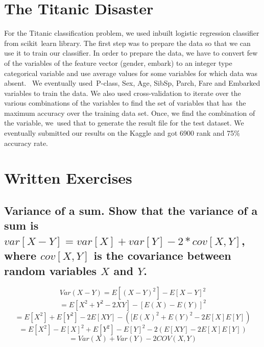 \documentclass[11pt,letterpaper]{article}
\begin{document}
\section{The Titanic Disaster}
For the Titanic classification problem, we used inbuilt logistic regression classifier from scikit learn library. The first step was to prepare the data so that we can use it to train our classifier. In order to prepare the data, we have to convert few of the variables of the feature vector (gender, embark) to an integer type categorical variable and use average values for some variables for which data was absent.  We eventually used P-class, Sex, Age, SibSp, Parch, Fare and Embarked variables to train the data. We also used cross-validation to iterate over the various combinations of the variables to find the set of variables that has the maximum accuracy over the training data set. Once, we find the combination of the variable, we used that to generate the result file for the test dataset. We eventually submitted our results on the Kaggle and got 6900 rank and 75\% accuracy rate.

\section{Written Exercises}
\subsection{Variance of a sum. Show that the variance of a sum is $var[X-Y]=var[X] + var[Y] - 2*cov[X,Y]$, where $cov[X,Y]$ is the covariance between random variables $X$ and $Y$.}
$$ Var(X-Y) = E[(X-Y)^2] - E[X-Y]^2$$
$$ = E[X^2+Y^2 - 2XY] - [E(X)-E(Y)]^2$$
$$ = E[X^2]+E[Y^2]-2E[XY] - ([E(X)^2+E(Y)^2-2E[X]E[Y])$$
$$ = E[X^2] - E[X]^2 +E[Y^2]- E[Y]^2- 2(E[XY] - 2E[X]E[Y])$$
$$ = Var(X) + Var(Y) - 2 COV(X,Y)$$
\end{document}
